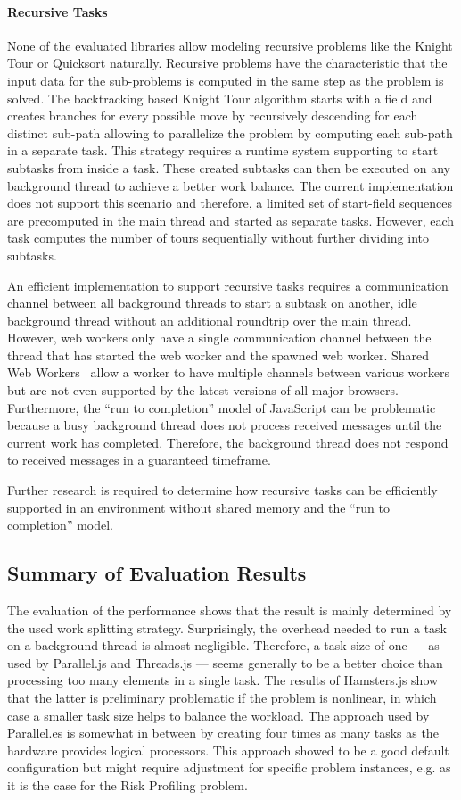 \paragraph{Recursive Tasks} 
None of the evaluated libraries allow modeling recursive problems like the Knight Tour or Quicksort naturally. Recursive problems have the characteristic that the input data for the sub-problems is computed in the same step as the problem is solved. The backtracking based Knight Tour algorithm starts with a field and creates branches for every possible move by recursively descending for each distinct sub-path allowing to parallelize the problem by computing each sub-path in a separate task. This strategy requires a runtime system supporting to start subtasks from inside a task. These created subtasks can then be executed on any background thread to achieve a better work balance. The current implementation does not support this scenario and therefore, a limited set of start-field sequences are precomputed in the main thread and started as separate tasks. However, each task computes the number of tours sequentially without further dividing into subtasks.


An efficient implementation to support recursive tasks requires a communication channel between all background threads to start a subtask on another, idle background thread without an additional roundtrip over the main thread. However, web workers only have a single communication channel between the thread that has started the web worker and the spawned web worker. Shared Web Workers~\cite[section 4.6.4]{w3cWebWorker} allow a worker to have multiple channels between various workers but are not even supported by the latest versions of all major browsers. Furthermore, the \enquote{run to completion} model of JavaScript can be problematic because a busy background thread does not process received messages until the current work has completed. Therefore, the background thread does not respond to received messages in a guaranteed timeframe.

Further research is required to determine how recursive tasks can be efficiently supported in an environment without shared memory and the \enquote{run to completion} model.

\subsection{Summary of Evaluation Results}
The evaluation of the performance shows that the result is mainly determined by the used work splitting strategy. Surprisingly, the overhead needed to run a task on a background thread is almost negligible. Therefore, a task size of one --- as used by Parallel.js and Threads.js --- seems generally to be a better choice than processing too many elements in a single task. The results of Hamsters.js show that the latter is preliminary problematic if the problem is nonlinear, in which case a smaller task size helps to balance the workload. The approach used by Parallel.es is somewhat in between by creating four times as many tasks as the hardware provides logical processors. This approach showed to be a good default configuration but might require adjustment for specific problem instances, e.g. as it is the case for the Risk Profiling problem.

